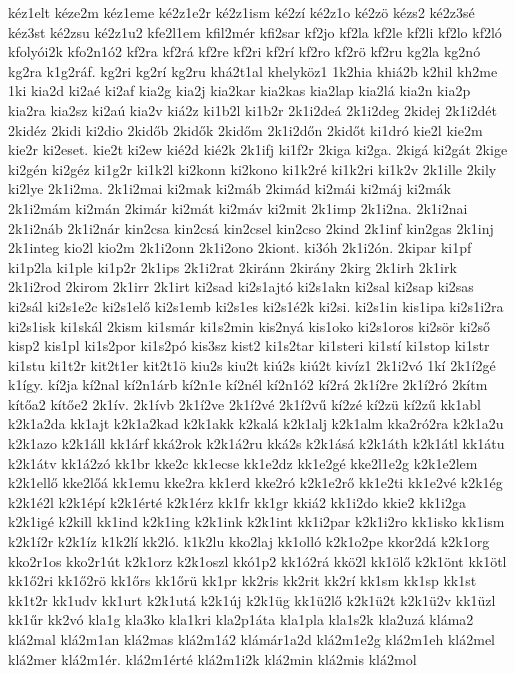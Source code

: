 {kéz1elt
kéze2m
kéz1eme
ké2z1e2r
ké2z1ism
ké2zí
ké2z1o
ké2zö
kézs2
ké2z3sé
kéz3st
ké2zsu
ké2z1u2
kfe2l1em
kfil2mér
kfi2sar
kf2jo
kf2la
kf2le
kf2li
kf2lo
kf2ló
kfolyói2k
kfo2n1ó2
kf2ra
kf2rá
kf2re
kf2ri
kf2rí
kf2ro
kf2rö
kf2ru
kg2la
kg2nó
kg2ra
k1g2ráf.
kg2ri
kg2rí
kg2ru
khá2t1al
khelyköz1
1k2hia
khiá2b
k2hil
kh2me
1ki
kia2d
ki2aé
ki2af
kia2g
kia2j
kia2kar
kia2kas
kia2lap
kia2lá
kia2n
kia2p
kia2ra
kia2sz
ki2aú
kia2v
kiá2z
ki1b2l
ki1b2r
2k1i2deá
2k1i2deg
2kidej
2k1i2dét
2kidéz
2kidi
ki2dio
2kidőb
2kidők
2kidőm
2k1i2dőn
2kidőt
ki1dró
kie2l
kie2m
kie2r
ki2eset.
kie2t
ki2ew
kié2d
kié2k
2k1ifj
ki1f2r
2kiga
ki2ga.
2kigá
ki2gát
2kige
ki2gén
ki2géz
ki1g2r
ki1k2l
ki2konn
ki2kono
ki1k2ré
ki1k2ri
ki1k2v
2k1ille
2kily
ki2lye
2k1i2ma.
2k1i2mai
ki2mak
ki2máb
2kimád
ki2mái
ki2máj
ki2mák
2k1i2mám
ki2mán
2kimár
ki2mát
ki2máv
ki2mit
2k1imp
2k1i2na.
2k1i2nai
2k1i2náb
2k1i2nár
kin2csa
kin2csá
kin2csel
kin2cso
2kind
2k1inf
kin2gas
2k1inj
2k1integ
kio2l
kio2m
2k1i2onn
2k1i2ono
2kiont.
ki3óh
2k1i2ón.
2kipar
ki1pf
ki1p2la
ki1ple
ki1p2r
2k1ips
2k1i2rat
2kiránn
2kirány
2kirg
2k1irh
2k1irk
2k1i2rod
2kirom
2k1irr
2k1irt
ki2sad
ki2s1ajtó
ki2s1akn
ki2sal
ki2sap
ki2sas
ki2sál
ki2s1e2c
ki2s1elő
ki2s1emb
ki2s1es
ki2s1é2k
ki2si.
ki2s1in
kis1ipa
ki2s1i2ra
ki2s1isk
ki1skál
2kism
ki1smár
ki1s2min
kis2nyá
kis1oko
ki2s1oros
ki2sör
ki2ső
kisp2
kis1pl
ki1s2por
ki1s2pó
kis3sz
kist2
ki1s2tar
ki1steri
ki1stí
ki1stop
ki1str
ki1stu
ki1t2r
kit2t1er
kit2t1ö
kiu2s
kiu2t
kiú2s
kiú2t
kivíz1
2k1i2vó
1kí
2k1í2gé
k1így.
kí2ja
kí2nal
kí2n1árb
kí2n1e
kí2nél
kí2n1ó2
kí2rá
2k1í2re
2k1í2ró
2kítm
kítőa2
kítőe2
2k1ív.
2k1ívb
2k1í2ve
2k1í2vé
2k1í2vű
kí2zé
kí2zü
kí2zű
kk1abl
k2k1a2da
kk1ajt
k2k1a2kad
k2k1akk
k2kalá
k2k1alj
k2k1alm
kka2ró2ra
k2k1a2u
k2k1azo
k2k1áll
kk1árf
kká2rok
k2k1á2ru
kká2s
k2k1ásá
k2k1áth
k2k1átl
kk1átu
k2k1átv
kk1á2zó
kk1br
kke2c
kk1ecse
kk1e2dz
kk1e2gé
kke2l1e2g
k2k1e2lem
k2k1ellő
kke2lőá
kk1emu
kke2ra
kk1erd
kke2ró
k2k1e2rő
kk1e2ti
kk1e2vé
k2k1ég
k2k1é2l
k2k1épí
k2k1érté
k2k1érz
kk1fr
kk1gr
kkiá2
kk1i2do
kkie2
kk1i2ga
k2k1igé
k2kill
kk1ind
k2k1ing
k2k1ink
k2k1int
kk1i2par
k2k1i2ro
kk1isko
kk1ism
k2k1í2r
k2k1íz
k1k2lí
kk2ló.
k1k2lu
kko2laj
kk1olló
k2k1o2pe
kkor2dá
k2k1org
kko2r1os
kko2r1út
k2k1orz
k2k1oszl
kkó1p2
kk1ó2rá
kkö2l
kk1ölő
k2k1önt
kk1ötl
kk1ő2ri
kk1ő2rö
kk1őrs
kk1őrü
kk1pr
kk2ris
kk2rit
kk2rí
kk1sm
kk1sp
kk1st
kk1t2r
kk1udv
kk1urt
k2k1utá
k2k1új
k2k1üg
kk1ü2lő
k2k1ü2t
k2k1ü2v
kk1üzl
kk1űr
kk2vó
kla1g
kla3ko
kla1kri
kla2p1áta
kla1pla
kla1s2k
kla2uzá
kláma2
klá2mal
klá2m1an
klá2mas
klá2m1á2
klámár1a2d
klá2m1e2g
klá2m1eh
klá2mel
klá2mer
klá2m1ér.
klá2m1érté
klá2m1i2k
klá2min
klá2mis
klá2mol
}
